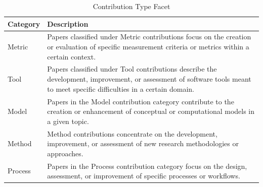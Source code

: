             \begin{table}[h]
                \centering
        	    {
        	    \begin{tabular}{ | m{2cm} | m{12.5cm} | }
                    \hline
                    \rowcolor{teal!30} \textbf{Category} & \textbf{Description} \\
                    
                    \hline
                    Metric  & Papers classified under Metric contributions focus on the creation or evaluation of specific measurement criteria or metrics within a certain context.\\
                    
                    \hline
                    Tool & Papers classified under Tool contributions describe the development, improvement, or assessment of software tools meant to meet specific difficulties in a certain domain.\\
                    
                    \hline
                    Model  & Papers in the Model contribution category contribute to the creation or enhancement of conceptual or computational models in a given topic.\\
                    
                    \hline
                    Method  & Method contributions concentrate on the development, improvement, or assessment of new research methodologies or approaches.\\
                    
                    \hline
                    Process  & Papers in the Process contribution category focus on the design, assessment, or improvement of specific processes or workflows.\\
                    
                    \hline
                \end{tabular}}
                \caption{\label{tab:contri-ty-face} Contribution Type Facet}
            \end{table}

